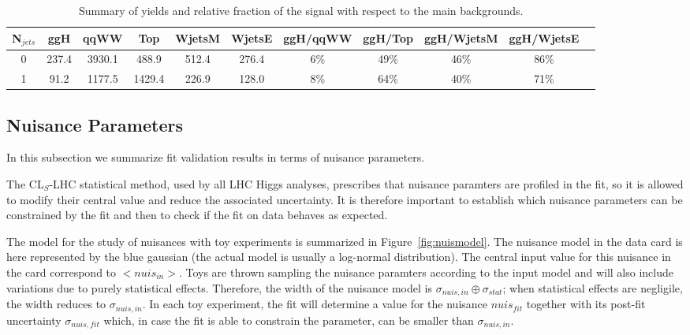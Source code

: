 \begin{table}
\begin{center}
\begin{tabular}{c | c c c c c | c  c  c c c }
\hline
N$_{jets}$ & ggH & qqWW & Top & WjetsM & WjetsE & ggH/qqWW & ggH/Top & ggH/WjetsM & ggH/WjetsE \\
\hline
0 & 237.4 & 3930.1 & 488.9  & 512.4 & 276.4 & 6\% & 49\% & 46\% &  86\%\\
1 & 91.2  & 1177.5 & 1429.4 & 226.9 & 128.0 & 8\% & 64\% & 40\% &  71\%\\
\hline
\end{tabular}
\caption{Summary of yields and relative fraction of the signal with respect to the main backgrounds.}
\label{tab:yield_summary}
\end{center}
\end{table}

\subsection{Nuisance Parameters}

In this subsection we summarize fit validation results in terms of nuisance parameters.

The CL$_S$-LHC statistical method, used by all LHC Higgs analyses, prescribes that nuisance paramters are profiled in the fit, 
so it is allowed to modify their central value and reduce the associated uncertainty. %
It is therefore important to establish which nuisance parameters can be constrained by the fit and then to check if the fit 
on data behaves as expected.

The model for the study of nuisances with toy experiments is summarized in Figure~\ref{fig:nuismodel}.
The nuisance model in the data card is here represented by the blue gaussian (the actual model is usually a log-normal distribution).
The central input value for this nuisance in the card correspond to $<$$nuis_{in}$$>$. 
Toys are thrown sampling the nuisance paramters according to the input model and will also include variations 
due to purely statistical effects. Therefore, the width of the nuisance model is $\sigma_{nuis,in} \oplus \sigma_{stat}$; 
when statistical effects are negligile, the width reduces to $\sigma_{nuis,in}$. 
In each toy experiment, the fit will determine a value for the nuisance $nuis_{fit}$ together with its post-fit uncertainty 
$\sigma_{nuis,fit}$ which, in case the fit is able to constrain the parameter, can be smaller than $\sigma_{nuis,in}$.

